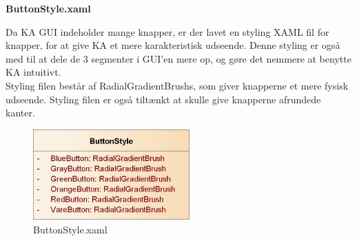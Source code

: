 \textbf{ButtonStyle.xaml}

Da \gls{KA} \gls{GUI} indeholder mange knapper, er der lavet en styling XAML fil for knapper, for at give \gls{KA} et mere karakteristisk udseende. Denne styling er også med til at dele de 3 segmenter i GUI'en mere op, og gøre det nemmere at benytte \gls{KA} intuitivt. \\
Styling filen består af RadialGradientBrushs, som giver knapperne et mere fysisk udseende. Styling filen er også tiltænkt at skulle give knapperne afrundede kanter.

\begin{figure}[H]
	\centering
	\includegraphics[width=60mm]{Systemdesign/Frontend/GUI/Pics/xaml}
	\caption{ButtonStyle.xaml}
	\label{fig:ButtonStyleXaml}
\end{figure}
